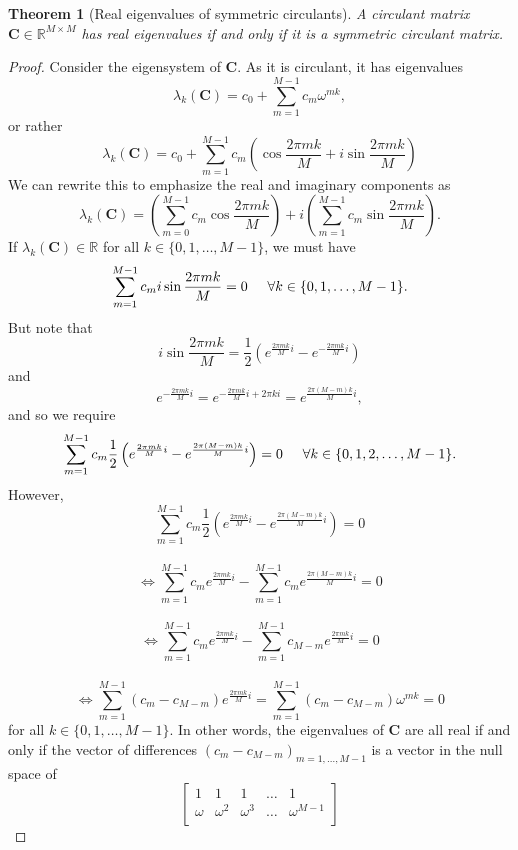 \documentclass[letterpaper,12pt,oneside,final]{article}
\newtheorem{theorem}{Theorem}
\newcommand{\m}[1]{\mathbf{#1}}               %
\newcommand{\field}[1]{\mathbb{#1}}
\newcommand{\Reals}{\field{R}}
\begin{document}
\begin{theorem}[Real eigenvalues of symmetric circulants] \label{thm:symmEigen}
  A circulant matrix $\m{C} \in \Reals^{M \times M}$ has real eigenvalues if and only if it is a symmetric circulant matrix.
\end{theorem}
\begin{proof}
  Consider the eigensystem of $\m{C}$. As it is circulant, it has eigenvalues
  $$\lambda_k (\m{C}) = c_0 + \sum_{m = 1}^{M-1} c_m \omega^{mk},$$
  or rather
  $$\lambda_k (\m{C}) = c_0 + \sum_{m = 1}^{M-1} c_m \left ( \cos \frac{2\pi mk}{M} + i \sin \frac{2\pi mk}{M} \right )$$
  We can rewrite this to emphasize the real and imaginary components as
  $$\lambda_k (\m{C}) = \left ( \sum_{m = 0}^{M-1} c_m \cos \frac{2\pi mk}{M} \right ) + i \left ( \sum_{m = 1}^{M-1} c_m \sin \frac{2\pi mk}{M} \right ).$$
  If $\lambda_k (\m{C}) \in \Reals$ for all $k \in \{0, 1, \dots, M-1\}$, we must have
  $$\sum_{m = 1}^{M-1} c_m i \sin \frac{2\pi mk}{M} = 0 \hspace{0.5cm} \forall k \in \{0, 1, \dots, M-1\}.$$
  But note that
  $$i \sin \frac{2\pi mk}{M} = \frac{1}{2} \left ( e^{\frac{2\pi mk}{M} i} - e^{-\frac{2\pi mk}{M} i} \right )$$
  and
  $$e^{-\frac{2\pi mk}{M} i} = e^{-\frac{2\pi mk}{M} i + 2\pi ki} = e^{\frac{2\pi (M - m)k}{M} i},$$
  and so we require
  $$\sum_{m = 1}^{M-1} c_m \frac{1}{2} \left ( e^{\frac{2\pi mk}{M}i} - e^{\frac{2\pi (M-m)k}{M}i} \right ) = 0 \hspace{0.5cm} \forall k \in \{0, 1, 2, \dots, M-1\}.$$
  However,
  $$\sum_{m = 1}^{M-1} c_m \frac{1}{2} \left ( e^{\frac{2\pi mk}{M}i} - e^{\frac{2\pi (M-m)k}{M}i} \right ) = 0$$
  \\
  $$\iff \sum_{m = 1}^{M-1} c_m e^{\frac{2\pi mk}{M}i} - \sum_{m = 1}^{M-1} c_m e^{\frac{2\pi (M-m)k}{M}i} = 0$$
  \\
  $$\iff \sum_{m = 1}^{M-1} c_m e^{\frac{2\pi mk}{M}i} - \sum_{m = 1}^{M-1} c_{M-m} e^{\frac{2\pi mk}{M}i} = 0$$
  \\
  $$\iff \sum_{m = 1}^{M-1} ( c_m - c_{M-m} ) e^{\frac{2\pi mk}{M}i} = \sum_{m = 1}^{M-1} ( c_m - c_{M-m} ) \omega^{mk} = 0$$
  for all $k \in \{0, 1, \dots, M-1\}$. In other words, the eigenvalues of $\m{C}$ are all real if and only if the vector of differences $(c_m - c_{M-m})_{m=1,\dots,M-1}$ is a vector in the null space of
  $$\begin{bmatrix}
  1 & 1 & 1 & \dots & 1 \\
  \omega & \omega^2 & \omega^3 & \dots & \omega^{M-1} \\

\end{bmatrix}$$
\end{proof}
\end{document}
